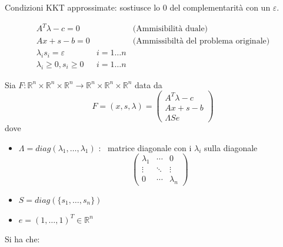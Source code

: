 Condizioni KKT approssimate:  sostiusce lo 0 del complementarit\`a con 
un $\varepsilon$.
\begin{center}
\fbox
{
 \begin{minipage}[position]{0.75\textwidth}
$$
\begin{array}{lll}
A^{T}\lambda  -c = 0 & & \text{(Ammisibilit\`a duale)}  \\
 Ax +s - b = 0 & &  \text{(Ammissibilt\`a del problema originale)} \\
 \lambda_i  s_i = \varepsilon & i=1\ldots n & \\
 \lambda_i \geq 0, s_i \geq 0 & i=1\ldots n  &
\end{array}
$$
\end{minipage}
}
\end{center}

Sia $F: \mathbb{R}^{n} \times \mathbb{R}^{n} \times \mathbb{R}^{n}
   \rightarrow
   \mathbb{R}^{n} \times \mathbb{R}^{n} \times \mathbb{R}^{n}$ data da
$$
F=(x, s , \lambda) =
\begin{pmatrix}
  A^{T} \lambda - c \\
  Ax  + s - b  \\
 \Lambda S e
\end{pmatrix}
$$
dove
\begin{itemize}
\item $\Lambda  = diag(\lambda_1,  \ldots , \lambda_1)$ : \ matrice diagonale con i $\lambda_i$ sulla diagonale
$$
\begin{pmatrix}
  \lambda_1 & \cdots & 0 \\
   \vdots & \ddots & \vdots \\
   0 &  \cdots & \lambda_n
\end{pmatrix}
$$
\item $S = diag(\{s_1, \ldots,  s_n \} )$
\item $e = (1, \ldots, 1)^{T} \in \mathbb{R}^{n}$
\end{itemize}
Si ha che:

